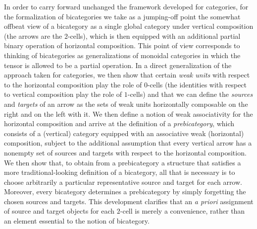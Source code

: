 \documentclass[11pt,notitlepage,a4paper]{report}
\begin{document}
In order to carry forward unchanged the framework developed for categories, for the
formalization of bicategories we take as a jumping-off point the somewhat offbeat view of
a bicategory as a single global category under vertical composition (the arrows are
the $2$-cells), which is then equipped with an additional partial binary operation of
horizontal composition.  This point of view corresponds to thinking of bicategories as
generalizations of monoidal categories in which the tensor is allowed to be a partial
operation.  In a direct generalization of the approach taken for categories,
we then show that certain \emph{weak units} with respect to the horizontal composition play
the role of $0$-cells (the identities with respect to vertical composition play the role
of $1$-cells) and that we can define the \emph{sources} and \emph{targets} of an arrow
as the sets of weak units horizontally composable on the right and on the left with it.  
We then define a notion of weak associativity for the horizontal composition and arrive
at the definition of a \emph{prebicategory}, which consists of a (vertical) category equipped
with an associative weak (horizontal) composition, subject to the additional assumption
that every vertical arrow has a nonempty set of sources and targets with respect to
the horizontal composition.
We then show that, to obtain from a prebicategory a structure that satisfies a more
traditional-looking definition of a bicategory, all that is necessary is to choose
arbitrarily a particular representative source and target for each arrow.
Moreover, every bicategory determines a prebicategory by simply forgetting the chosen
sources and targets.
This development clarifies that an \emph{a priori} assignment of source and target objects
for each $2$-cell is merely a convenience, rather than an element essential to the notion
of bicategory.
\end{document}
